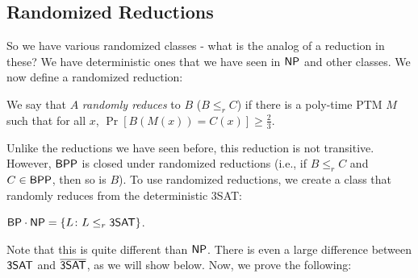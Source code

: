 \subsection{Randomized Reductions}
So we have various randomized classes - what is the analog of a reduction in these? We have deterministic ones that we have seen in ${\mathsf{NP}}$ and other classes. We now define a randomized reduction:
\begin{definition}
We say that $A$ \emph{randomly reduces} to $B$ ($B \le_r C$) if there is a poly-time PTM $M$ such that for all $x$, $\Pr[B(M(x)) = C(x)] \ge \frac{2}{3}$. 
\end{definition}
Unlike the reductions we have seen before, this reduction is not transitive. However, ${\mathsf{BPP}}$ is closed under randomized reductions (i.e., if $B \le_r C$ and $C \in {\ensuremath{\mathsf{BPP}}}$, then so is $B$). To use randomized reductions, we create a class that randomly reduces from the deterministic 3SAT:
\begin{definition}
${\mathsf{BP}}\cdot {\ensuremath{\mathsf{NP}}} = \{L \colon L \le_r {\mathsf{3SAT}}\}$. 
\end{definition}
Note that this is quite different than ${\mathsf{NP}}$. There is even a large difference between ${\mathsf{3SAT}}$ and $\overline{{\mathsf{3SAT}}}$, as we will show below. Now, we prove the following:

